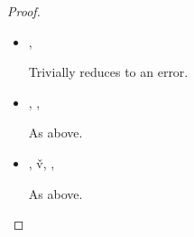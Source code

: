 \begin{lemma}
\begin{proof}
\begin{case}[T-DefMethod]
\begin{itemize}
\begin{subcase}[B-DefMethod]
      \end{subcase}

    \item[]
      \begin{subcase}[BE-DefMethod1]
        \opsem {\openv{}}
               {}
               {\errorval{\v{}}},
        \opsem {\openv{}}
                  {\e{}}
                {\errorval{\v{}}}

                Trivially reduces to an error.

      \end{subcase}
    \item[]
      \begin{subcase}[BE-DefMethod2]
        \opsem {\openv{}}
         {}
         { {\disptable{}}},
  \opsem {\openv{}}
         {}
         {\errorval{\v{}}},
        \opsem {\openv{}}
                  {\e{}}
                {\errorval{\v{}}}

                As above.
      \end{subcase}
    \item[]
      \begin{subcase}[BE-DefMethod3]
        \opsem {\openv{}}
         {}
         { {\disptable{}}},
  \opsem {\openv{}}
         {}
         {\v{v}},
  \opsem {\openv{}}
         {}
         {\errorval{\v{}}},
        \opsem {\openv{}}
                  {\e{}}
                {\errorval{\v{}}}

                As above.

      \end{subcase}
  \end{itemize}
\end{case}


\end{proof}
\end{lemma}
